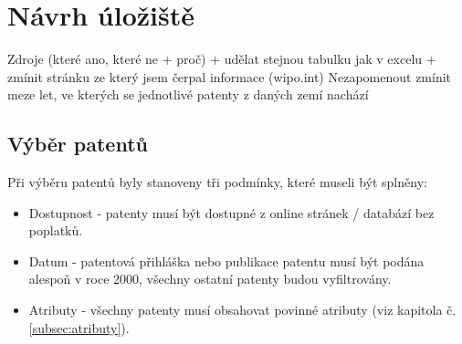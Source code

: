 \chapter{Návrh úložiště}


Zdroje (které ano, které ne + proč) + udělat stejnou tabulku jak v excelu + zmínit stránku ze který jsem čerpal informace (wipo.int)\newline
Nezapomenout zmínit meze let, ve kterých se jednotlivé patenty z daných zemí nachází 

\section{Výběr patentů}
Při výběru patentů byly stanoveny tři podmínky, které museli být splněny:
\begin{itemize}
\item Dostupnost - patenty musí být dostupné z online stránek / databází bez poplatků.
\item Datum - patentová přihláška nebo publikace patentu musí být podána alespoň v roce 2000, všechny ostatní patenty budou vyfiltrovány.
\item Atributy - všechny patenty musí obsahovat povinné atributy (viz kapitola č. \ref{subsec:atributy}).
\end{itemize}

